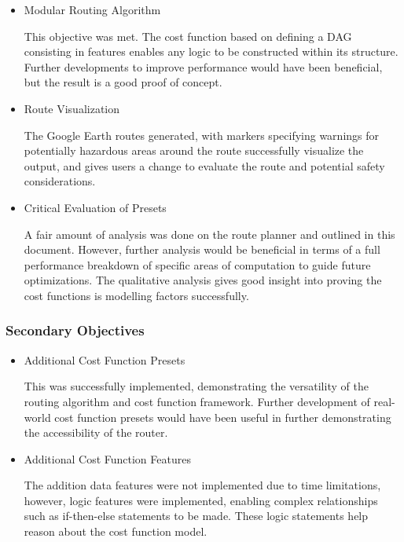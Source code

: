 \documentclass[12pt]{article}
\begin{document}
\begin{itemize}
  \item Modular Routing Algorithm

        This objective was met. The cost function based on defining a DAG consisting in features enables any logic to be constructed within its structure. Further developments to improve performance would have been beneficial, but the result is a good proof of concept.

  \item Route Visualization

        The Google Earth routes generated, with markers specifying warnings for potentially hazardous areas around the route successfully visualize the output, and gives users a change to evaluate the route and potential safety considerations.

  \item Critical Evaluation of Presets

        A fair amount of analysis was done on the route planner and outlined in this document. However, further analysis would be beneficial in terms of a full performance breakdown of specific areas of computation to guide future optimizations. The qualitative analysis gives good insight into proving the cost functions is modelling factors successfully.

\end{itemize}

\subsubsection{Secondary Objectives}

\begin{itemize}
  \item Additional Cost Function Presets

        This was successfully implemented, demonstrating the versatility of the routing algorithm and cost function framework. Further development of real-world cost function presets would have been useful in further demonstrating the accessibility of the router.

  \item Additional Cost Function Features

        The addition data features were not implemented due to time limitations, however, logic features were implemented, enabling complex relationships such as if-then-else statements to be made. These logic statements help reason about the cost function model.

\end{itemize}
\end{document}

